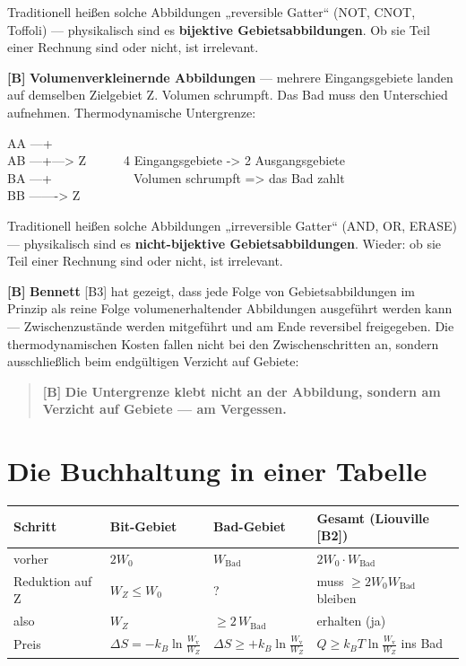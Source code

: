 Traditionell heißen solche Abbildungen „reversible Gatter“ (NOT, CNOT, Toffoli)
--- physikalisch sind es \textbf{bijektive Gebietsabbildungen}. Ob sie Teil einer
Rechnung sind oder nicht, ist irrelevant.

\textbf{[B]} \textbf{Volumenverkleinernde Abbildungen} --- mehrere Eingangsgebiete landen
auf demselben Zielgebiet Z. Volumen schrumpft. Das Bad muss den Unterschied
aufnehmen. Thermodynamische Untergrenze:

\begin{center}
\begin{minipage}{0.75\textwidth}
\ttfamily\small
AA ---+\\
AB ---+---> Z\ \ \ \ \ \ 4 Eingangsgebiete -> 2 Ausgangsgebiete\\
BA ---+\ \ \ \ \ \ \ \ \ \ \ \ \ Volumen schrumpft => das Bad zahlt\\
BB -------> Z
\end{minipage}
\end{center}

Traditionell heißen solche Abbildungen „irreversible Gatter“ (AND, OR, ERASE) ---
physikalisch sind es \textbf{nicht-bijektive Gebietsabbildungen}. Wieder: ob sie
Teil einer Rechnung sind oder nicht, ist irrelevant.

\textbf{[B]} \textbf{Bennett} [B3] hat gezeigt, dass jede Folge von Gebietsabbildungen im
Prinzip als reine Folge volumenerhaltender Abbildungen ausgeführt werden kann ---
Zwischenzustände werden mitgeführt und am Ende reversibel freigegeben. Die
thermodynamischen Kosten fallen nicht bei den Zwischenschritten an, sondern
ausschließlich beim endgültigen Verzicht auf Gebiete:

\begin{quote}
\textbf{[B]} \textbf{Die Untergrenze klebt nicht an der Abbildung, sondern am Verzicht auf
Gebiete --- am Vergessen.}
\end{quote}

\section{Die Buchhaltung in einer Tabelle}

\begin{center}
\small
\begin{tabular}{@{}llll@{}}
\toprule
\textbf{Schritt} & \textbf{Bit-Gebiet} & \textbf{Bad-Gebiet} & \textbf{Gesamt (Liouville [B2])} \\
\midrule
vorher & $2W_0$ & $W_{\text{Bad}}$ & $2W_0 \cdot W_{\text{Bad}}$ \\
Reduktion auf Z & $W_Z \le W_0$ & ? & muss $\ge 2W_0 W_{\text{Bad}}$ bleiben \\
also & $W_Z$ & $\ge 2\,W_{\text{Bad}}$ & erhalten (ja) \\
Preis & $\Delta S = -k_B \ln\frac{W_{\text{v}}}{W_Z}$ & $\Delta S \ge +k_B \ln\frac{W_{\text{v}}}{W_Z}$ & $Q \ge k_B T \ln\frac{W_{\text{v}}}{W_Z}$ ins Bad \\
\bottomrule
\end{tabular}
\end{center}

